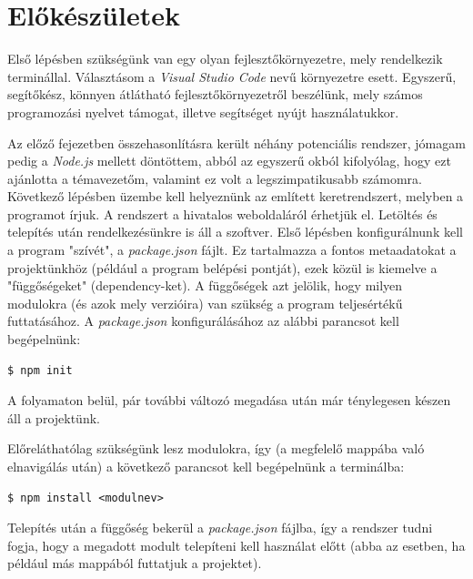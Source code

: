 

\section{Előkészületek}

Első lépésben szükségünk van egy olyan fejlesztőkörnyezetre, mely rendelkezik terminállal. Választásom a \textit{Visual Studio Code} nevű környezetre esett. Egyszerű, segítőkész, könnyen átlátható fejlesztőkörnyezetről beszélünk, mely számos programozási nyelvet támogat, illetve segítséget nyújt használatukkor.

Az előző fejezetben összehasonlításra került néhány potenciális rendszer, jómagam pedig a \textit{Node.js} mellett döntöttem, abból az egyszerű okból kifolyólag, hogy ezt ajánlotta a témavezetőm, valamint ez volt a legszimpatikusabb számomra. Következő lépésben üzembe kell helyeznünk az említett keretrendszert, melyben a programot írjuk. A rendszert a hivatalos weboldaláról érhetjük el. Letöltés és telepítés után rendelkezésünkre is áll a szoftver. Első lépésben konfigurálnunk kell a program "szívét", a \textit{package.json} fájlt. Ez tartalmazza a fontos metaadatokat a projektünkhöz (például a program belépési pontját), ezek közül is kiemelve a "függőségeket" (dependency-ket). A függőségek azt jelölik, hogy milyen modulokra (és azok mely verzióira) van szükség a program teljesértékű futtatásához. A \textit{package.json} konfigurálásához az alábbi parancsot kell begépelnünk:

\begin{verbatim}
$ npm init
\end{verbatim}

A folyamaton belül, pár további változó megadása után már ténylegesen készen áll a projektünk.

Előreláthatólag szükségünk lesz modulokra, így (a megfelelő mappába való elnavigálás után) a következő parancsot kell begépelnünk a terminálba:

\begin{verbatim}
$ npm install <modulnev>
\end{verbatim}

Telepítés után a függőség bekerül a \textit{package.json} fájlba, így a rendszer tudni fogja, hogy a megadott modult telepíteni kell használat előtt (abba az esetben, ha például más mappából futtatjuk a projektet).

